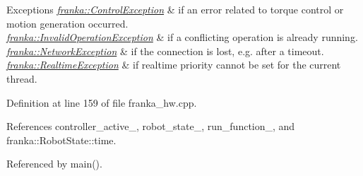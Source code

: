 \begin{DoxyExceptions}{Exceptions}
{\em \hyperlink{structfranka_1_1ControlException}{franka\+::\+Control\+Exception}} & if an error related to torque control or motion generation occurred. \\
\hline
{\em \hyperlink{structfranka_1_1InvalidOperationException}{franka\+::\+Invalid\+Operation\+Exception}} & if a conflicting operation is already running. \\
\hline
{\em \hyperlink{structfranka_1_1NetworkException}{franka\+::\+Network\+Exception}} & if the connection is lost, e.\+g. after a timeout. \\
\hline
{\em \hyperlink{structfranka_1_1RealtimeException}{franka\+::\+Realtime\+Exception}} & if realtime priority cannot be set for the current thread. \\
\hline
\end{DoxyExceptions}


Definition at line 159 of file franka\+\_\+hw.\+cpp.



References controller\+\_\+active\+\_\+, robot\+\_\+state\+\_\+, run\+\_\+function\+\_\+, and franka\+::\+Robot\+State\+::time.



Referenced by main().


